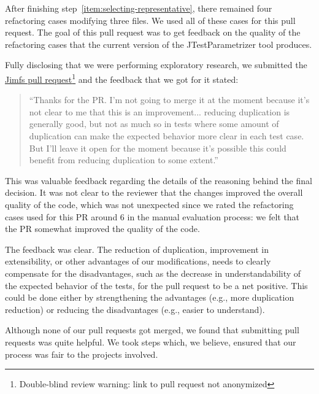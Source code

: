 After finishing step~\ref{item:selecting-representative}, there remained four refactoring cases modifying three files. We used all of these cases for this pull request. The goal of this pull request was to get feedback on the quality of the refactoring cases that the current version of the JTestParametrizer tool produces.

Fully disclosing that we were performing exploratory research, we submitted the \href{https://github.com/google/jimfs/pull/159}{Jimfs pull request}\footnote{Double-blind review warning: link to pull request not anonymized} and the feedback that we got for it stated: \begin{quote}``Thanks for the PR. I'm not going to merge it at the moment because it's not clear to me that this is an improvement... reducing duplication is generally good, but not as much so in tests where some amount of duplication can make the expected behavior more clear in each test case. But I'll leave it open for the moment because it's possible this could benefit from reducing duplication to some extent.''\end{quote}

This was valuable feedback regarding the details of the reasoning behind the final decision. It was not clear to the reviewer that the changes improved the overall quality of the code, which was not unexpected since we rated the refactoring cases used for this PR around 6 in the manual evaluation process: we felt that the PR somewhat improved the quality of the code. 

The feedback was clear. The reduction of duplication, improvement in extensibility, or other advantages of our modifications, needs to clearly compensate for the disadvantages, such as the decrease in understandability of the expected behavior of the tests, for the pull request to be a net positive. This could be done either by strengthening the advantages (e.g., more duplication reduction) or reducing the disadvantages (e.g., easier to understand).

Although none of our pull requests got merged, we found that submitting pull requests was quite helpful. We took steps which, we believe, ensured that our process was fair to the projects involved.



